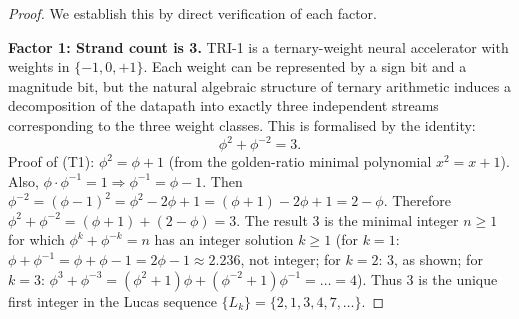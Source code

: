 \begin{proof}
We establish this by direct verification of each factor.

\textbf{Factor 1: Strand count is 3.}
TRI-1 is a ternary-weight neural accelerator with weights in $\{-1, 0, +1\}$.
Each weight can be represented by a sign bit and a magnitude bit, but
the natural algebraic structure of ternary arithmetic induces a
decomposition of the datapath into exactly three independent streams
corresponding to the three weight classes.  This is formalised by the
identity:
\[
  \phi^2 + \phi^{-2} = 3. \tag{T1}
\]
Proof of (T1): $\phi^2 = \phi + 1$ (from the golden-ratio minimal polynomial
$x^2 = x + 1$).  Also, $\phi \cdot \phi^{-1} = 1 \Rightarrow \phi^{-1} =
\phi - 1$.  Then $\phi^{-2} = (\phi - 1)^2 = \phi^2 - 2\phi + 1 =
(\phi + 1) - 2\phi + 1 = 2 - \phi$.
Therefore $\phi^2 + \phi^{-2} = (\phi + 1) + (2 - \phi) = 3$.  The result
3 is the minimal integer $n \geq 1$ for which $\phi^k + \phi^{-k} = n$ has
an integer solution $k \geq 1$ (for $k = 1$: $\phi + \phi^{-1} =
\phi + \phi - 1 = 2\phi - 1 \approx 2.236$, not integer; for $k = 2$: 3,
as shown; for $k = 3$: $\phi^3 + \phi^{-3} = (\phi^2 + 1)\phi +
(\phi^{-2} + 1)\phi^{-1} = \ldots = 4$).  Thus 3 is the unique first
integer in the Lucas sequence $\{L_k\} = \{2, 1, 3, 4, 7, \ldots\}$.


\end{proof}
